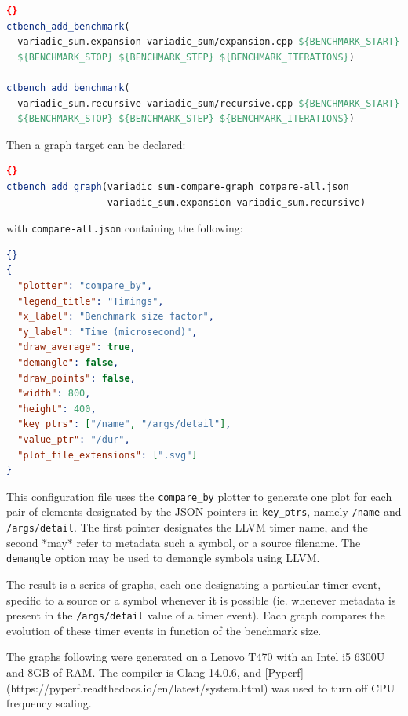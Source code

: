 \documentclass[../../main.tex]{subfiles}
\begin{document}
\begin{lstlisting}[language=CMake]{}
ctbench_add_benchmark(
  variadic_sum.expansion variadic_sum/expansion.cpp ${BENCHMARK_START}
  ${BENCHMARK_STOP} ${BENCHMARK_STEP} ${BENCHMARK_ITERATIONS})

ctbench_add_benchmark(
  variadic_sum.recursive variadic_sum/recursive.cpp ${BENCHMARK_START}
  ${BENCHMARK_STOP} ${BENCHMARK_STEP} ${BENCHMARK_ITERATIONS})
\end{lstlisting}

Then a graph target can be declared:

\begin{lstlisting}[language=CMake]{}
ctbench_add_graph(variadic_sum-compare-graph compare-all.json
                  variadic_sum.expansion variadic_sum.recursive)
\end{lstlisting}

with \lstinline{compare-all.json} containing the following:

\begin{lstlisting}[language=JSON]{}
{
  "plotter": "compare_by",
  "legend_title": "Timings",
  "x_label": "Benchmark size factor",
  "y_label": "Time (microsecond)",
  "draw_average": true,
  "demangle": false,
  "draw_points": false,
  "width": 800,
  "height": 400,
  "key_ptrs": ["/name", "/args/detail"],
  "value_ptr": "/dur",
  "plot_file_extensions": [".svg"]
}
\end{lstlisting}

This configuration file uses the \lstinline{compare_by} plotter to generate one
plot for each pair of elements designated by the JSON pointers in
\lstinline{key_ptrs}, namely \lstinline{/name} and \lstinline{/args/detail}. The
first pointer designates the LLVM timer name, and the second *may* refer to
metadata such a \cpp symbol, or a \cpp source filename. The \lstinline{demangle}
option may be used to demangle \cpp symbols using LLVM.

The result is a series of graphs, each one designating a particular timer event,
specific to a source or a symbol whenever it is possible (ie. whenever metadata
is present in the \lstinline{/args/detail} value of a timer event). Each graph
compares the evolution of these timer events in function of the benchmark size.

The graphs following were generated on a Lenovo T470 with an Intel i5 6300U and
8GB of RAM. The compiler is Clang
14.0.6, and [Pyperf](https://pyperf.readthedocs.io/en/latest/system.html) was
used to turn off CPU frequency scaling.
\end{document}

